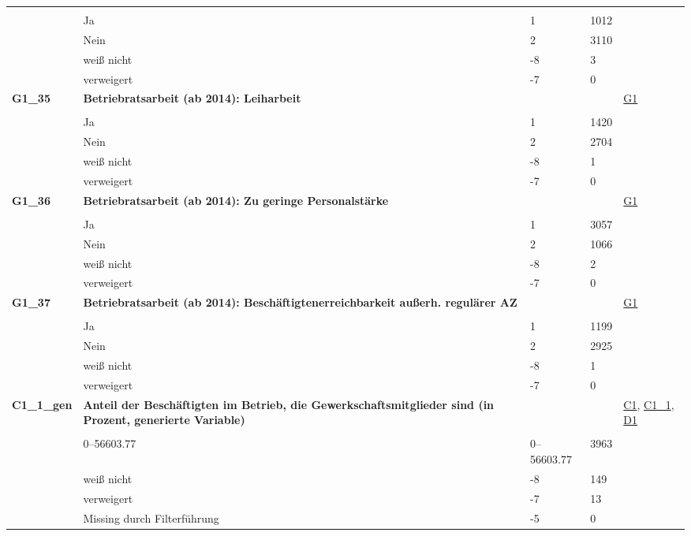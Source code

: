 \begin{longtable}{| L{2.5cm} | L{8.25cm}| C{1.5cm} | R{1.25cm} | C{2.25cm} |  }
   &  &  &  &  \\ 
   & Ja & 1 & 1012 &  \\ 
   & Nein & 2 & 3110 &  \\ 
   & weiß nicht & -8 & 3 &  \\ 
   & verweigert & -7 & 0 &  \\ 
   \midrule
\textbf{G1\_35}\label{var:suf:G1:35} & \textbf{Betriebratsarbeit (ab 2014): Leiharbeit} &  &  & \hyperref[G1]{G1} \\ 
   &  &  &  &  \\ 
   & Ja & 1 & 1420 &  \\ 
   & Nein & 2 & 2704 &  \\ 
   & weiß nicht & -8 & 1 &  \\ 
   & verweigert & -7 & 0 &  \\ 
   \midrule
\textbf{G1\_36}\label{var:suf:G1:36} & \textbf{Betriebratsarbeit (ab 2014): Zu geringe Personalstärke} &  &  & \hyperref[G1]{G1} \\ 
   &  &  &  &  \\ 
   & Ja & 1 & 3057 &  \\ 
   & Nein & 2 & 1066 &  \\ 
   & weiß nicht & -8 & 2 &  \\ 
   & verweigert & -7 & 0 &  \\ 
   \midrule
\textbf{G1\_37}\label{var:suf:G1:37} & \textbf{Betriebratsarbeit (ab 2014): Beschäftigtenerreichbarkeit außerh. regulärer AZ} &  &  & \hyperref[G1]{G1} \\ 
   &  &  &  &  \\ 
   & Ja & 1 & 1199 &  \\ 
   & Nein & 2 & 2925 &  \\ 
   & weiß nicht & -8 & 1 &  \\ 
   & verweigert & -7 & 0 &  \\ 
   \midrule
\textbf{C1\_1\_gen}\label{var:suf:C1:1:gen} & \textbf{Anteil der Beschäftigten im Betrieb, die Gewerkschaftsmitglieder sind (in Prozent, generierte Variable)} &  &  & \hyperref[C1]{C1}, \hyperref[C1:1]{C1\_1}, \hyperref[D1]{D1} \\ 
   &  &  &  &  \\ 
   & 0--56603.77 & 0--56603.77 & 3963 &  \\ 
   & weiß nicht & -8 & 149 &  \\ 
   & verweigert & -7 & 13 &  \\ 
   & Missing durch Filterführung & -5 & 0 &  \\ 

\end{longtable}
